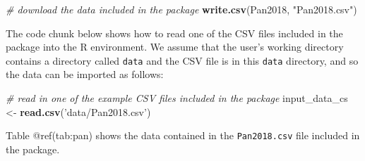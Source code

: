 \documentclass[]{elsarticle} %
\newenvironment{Shaded}{\begin{snugshade}}{\end{snugshade}}
\newcommand{\CommentTok}[1]{\textcolor[rgb]{0.56,0.35,0.01}{\textit{#1}}}
\newcommand{\KeywordTok}[1]{\textcolor[rgb]{0.13,0.29,0.53}{\textbf{#1}}}
\newcommand{\NormalTok}[1]{#1}
\newcommand{\StringTok}[1]{\textcolor[rgb]{0.31,0.60,0.02}{#1}}
\begin{document}
\begin{Shaded}
\begin{Highlighting}[]
\CommentTok{# download the data included in the package}
\KeywordTok{write.csv}\NormalTok{(Pan2018, }\StringTok{"Pan2018.csv"}\NormalTok{)}
\end{Highlighting}
\end{Shaded}

The code chunk below shows how to read one of the CSV files included in the package into the R environment. We assume that the user's working directory contains a directory called \texttt{data} and the CSV file is in this \texttt{data} directory, and so the data can be imported as follows:

\begin{Shaded}
\begin{Highlighting}[]
\CommentTok{# read in one of the example CSV files included in the package}
\NormalTok{input_data_cs <-}
\StringTok{  }\KeywordTok{read.csv}\NormalTok{(}\StringTok{'data/Pan2018.csv'}\NormalTok{)}
\end{Highlighting}
\end{Shaded}

Table @ref(tab:pan) shows the data contained in the \texttt{Pan2018.csv} file included in the package.
\end{document}
